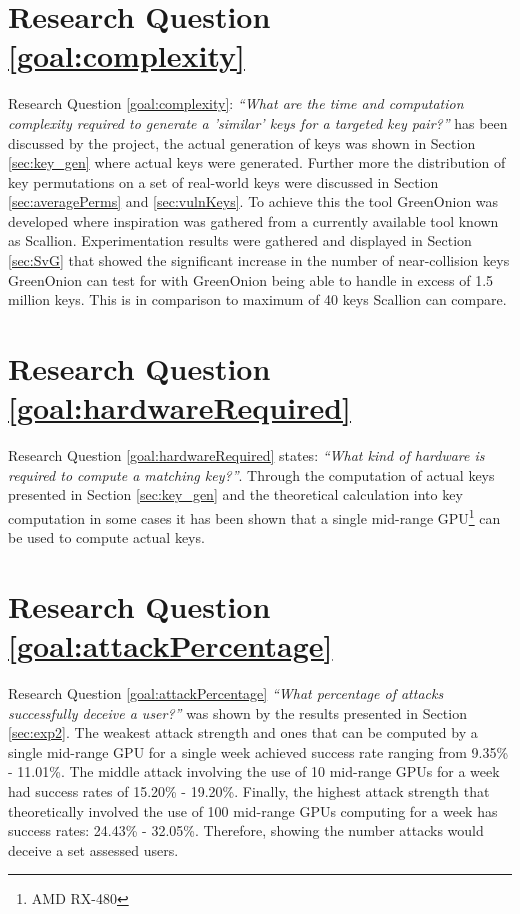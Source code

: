 \section{Research Question \ref{goal:complexity}}
Research Question \ref{goal:complexity}: \textit{``What are the time and computation complexity required to generate a ’similar’ keys for a targeted key pair?''} has been discussed by the project, the actual generation of keys was shown in Section \ref{sec:key_gen} where actual keys were generated. Further more the distribution of key permutations on a set of real-world keys were discussed in Section \ref{sec:averagePerms} and \ref{sec:vulnKeys}. To achieve this the tool GreenOnion was developed where inspiration was gathered from a currently available tool known as Scallion. Experimentation results were gathered and displayed in Section \ref{sec:SvG} that showed the significant increase in the number of near-collision keys GreenOnion can test for with GreenOnion being able to handle in excess of 1.5 million keys. This is in comparison to maximum of 40 keys Scallion can compare.

\section{Research Question \ref{goal:hardwareRequired}}
Research Question \ref{goal:hardwareRequired} states: \textit{``What kind of hardware is required to compute a matching key?''}. Through the computation of actual keys presented in Section \ref{sec:key_gen} and the theoretical calculation into key computation in some cases it has been shown that a single mid-range GPU\footnote{AMD RX-480} can be used to compute actual keys.

\section{Research Question \ref{goal:attackPercentage}}
Research Question \ref{goal:attackPercentage} \textit{``What percentage of attacks successfully deceive a user?''} was shown by the results presented in Section \ref{sec:exp2}. The weakest attack strength and ones that can be computed by a single mid-range GPU for a single week achieved success rate ranging from 9.35\% - 11.01\%. The middle attack involving the use of 10 mid-range GPUs for a week had success rates of 15.20\% - 19.20\%. Finally, the highest attack strength that theoretically involved the use of 100 mid-range GPUs computing for a week has success rates: 24.43\% - 32.05\%. Therefore, showing the number attacks would deceive a set assessed users.

